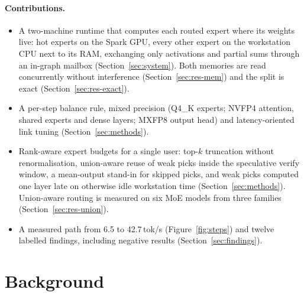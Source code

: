 \documentclass[11pt]{article}
\newcommand{\tps}{\,tok/s}
\begin{document}
\paragraph{Contributions.}
\begin{itemize}
  \item A two-machine runtime that computes each routed expert where its weights live: hot experts on the Spark GPU,
    every other expert on the workstation CPU next to its RAM, exchanging only activations and partial sums through an
    in-graph mailbox (Section~\ref{sec:system}). Both memories are read concurrently without interference
    (Section~\ref{sec:res-mem}) and the split is exact (Section~\ref{sec:res-exact}).
  \item A per-step balance rule, mixed precision (Q4\_K experts; NVFP4 attention, shared experts and dense layers; MXFP8
    output head) and latency-oriented link tuning (Section~\ref{sec:methods}).
  \item Rank-aware expert budgets for a single user: top-$k$ truncation without renormalisation, union-aware reuse of
    weak picks inside the speculative verify window, a mean-output stand-in for skipped picks, and weak picks computed
    one layer late on otherwise idle workstation time (Section~\ref{sec:methods}). Union-aware routing is measured on six
    MoE models from three families (Section~\ref{sec:res-union}).
  \item A measured path from 6.5 to 42.7\tps{} (Figure~\ref{fig:steps}) and twelve labelled findings, including
    negative results (Section~\ref{sec:findings}).
\end{itemize}

\section{Background}
\label{sec:background}
\end{document}
